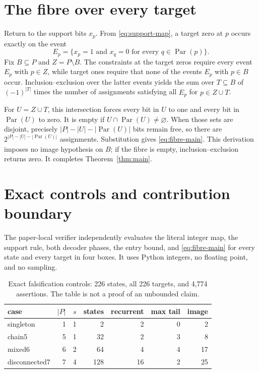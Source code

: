 \documentclass[10pt,a4paper]{amsart}
\theoremstyle{definition}
\theoremstyle{remark}
\newcommand{\Par}{\operatorname{Par}}
\begin{document}
\section{The fibre over every target}

Return to the support bits $x_p$.  From \eqref{eq:support-map}, a target
zero at $p$ occurs exactly on the event
\begin{equation}\label{eq:event}
 E_p=\{x_p=1\text{ and }x_q=0\text{ for every }q\in\Par(p)\}.
\end{equation}
Fix $B\subseteq P$ and $Z=P\setminus B$.  The constraints at the target
zeros require every event $E_p$ with $p\in Z$, while target ones require
that none of the events $E_p$ with $p\in B$ occur.  Inclusion--exclusion
over the latter events yields the sum over $T\subseteq B$ of
$(-1)^{|T|}$ times the number of assignments satisfying all $E_p$ for
$p\in Z\cup T$.

For $U=Z\cup T$, this intersection forces every bit in $U$ to one and every
bit in $\Par(U)$ to zero.  It is empty if $U\cap\Par(U)\ne\varnothing$.
When those sets are disjoint, precisely
$|P|-|U|-|\Par(U)|$ bits remain free, so there are
$2^{|P|-|U|-|\Par(U)|}$ assignments.  Substitution gives
\eqref{eq:fibre-main}.  This derivation imposes no image hypothesis on
$B$; if the fibre is empty, inclusion--exclusion returns zero.  It completes
Theorem~\ref{thm:main}.

\section{Exact controls and contribution boundary}

The paper-local verifier independently evaluates the literal integer map,
the support rule, both decoder phases, the entry bound, and
\eqref{eq:fibre-main} for every state and every target in four boxes.
It uses Python integers, no floating point, and no sampling.

\begin{table}[ht]
\centering
\small
\begin{tabular}{@{}lrrrrrr@{}}
\toprule
case & $|P|$ & $s$ & states & recurrent & max tail & image \\
\midrule
singleton & 1 & 1 & 2   & 2  & 0 & 2 \\
chain5    & 5 & 1 & 32  & 2  & 3 & 8 \\
mixed6    & 6 & 2 & 64  & 4  & 4 & 17 \\
disconnected7 & 7 & 4 & 128 & 16 & 2 & 25 \\
\bottomrule
\end{tabular}
\caption{Exact falsification controls: 226 states, all 226 targets, and
4,774 assertions.  The table is not a proof of an unbounded claim.}
\label{tab:control}
\end{table}
\end{document}

